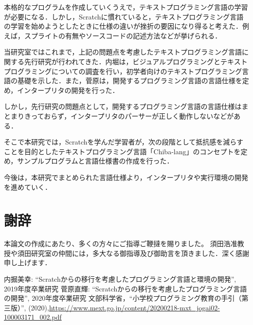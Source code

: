 \documentclass[10pt,a4j]{ltjsarticle}
\begin{document}
本格的なプログラムを作成していくうえで，テキストプログラミング言語の学習が必要になる．しかし，Scratchに慣れていると，テキストプログラミング言語の学習を始めようとしたときに仕様の違いが挫折の要因になり得ると考えた．例えば，スプライトの有無やソースコードの記述方法などが挙げられる．

当研究室ではこれまで，上記の問題点を考慮したテキストプログラミング言語に関する先行研究が行われてきた．内堀は，ビジュアルプログラミングとテキストプログラミングについての調査を行い，初学者向けのテキストプログラミング言語の基礎を示した\cite{senkou1}．また，菅原は，開発するプログラミング言語の言語仕様を定め，インタープリタの開発を行った\cite{senkou2}．

しかし，先行研究の問題点として，開発するプログラミング言語の言語仕様はまとまりきっておらず，インタープリタのパーサーが正しく動作しないなどがある．

そこで本研究では，Scratchを学んだ学習者が，次の段階として抵抗感を減らすことを目的としたテキストプログラミング言語「Chiba-lang」のコンセプトを定め，サンプルプログラムと言語仕様書の作成を行った．

今後は，本研究でまとめられた言語仕様より，インタープリタや実行環境の開発を進めていく．
\clearpage

\section{謝辞}
本論文の作成にあたり、多くの方々にご指導ご鞭撻を賜りました。
須田浩准教授や須田研究室の仲間には，多大なる御指導及び御助言を頂きました．深く感謝申し上げます．
\clearpage

\begin{thebibliography}{99}
 内掘美幸: ``Scratchからの移行を考慮したプログラミング言語と環境の開発'', 2019年度卒業研究
 菅原直輝: ``Scratchからの移行を考慮したプログラミング言語の開発'', 2020年度卒業研究
 文部科学省，``小学校プログラミング教育の手引（第三版）'', (2020),\url{https://www.mext.go.jp/content/20200218-mxt_jogai02-100003171_002.pdf}
\end{thebibliography}
\end{document}
